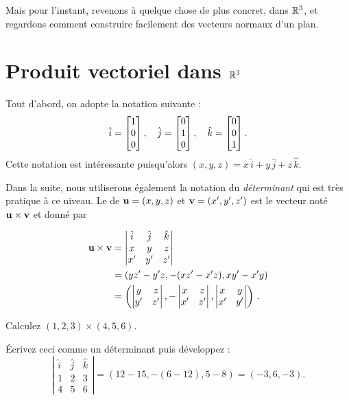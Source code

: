 Mais pour l'instant, revenons à quelque chose de plus concret, dans $\mathbb{R}^3$,
et regardons comment construire facilement des vecteurs normaux d'un plan.

\section{Produit vectoriel dans \texorpdfstring{$\mathbb{R}^3$}{R3}}

Tout d'abord, on adopte la notation suivante :
$$
\hat{i} = \left[ \begin{matrix} 1\\0\\0 \end{matrix} \right], \quad \hat{j} = \left[ \begin{matrix} 0\\1\\0 \end{matrix} \right], \quad \hat{k} = \left[ \begin{matrix} 0\\0\\1 \end{matrix} \right].
$$
Cette notation est intéressante puisqu'alors $(x,y,z) = x\,\hat{i} + y\,\hat{j} + z\,\hat{k}$.

Dans la suite, nous utiliserons également la notation du \emph{d\'eterminant} qui est très pratique à ce niveau.
Le  de $\mathbf{u} = (x,y,z)$ et $\mathbf{v}=(x', y', z')$
est le vecteur noté $\mathbf{u} \times \mathbf{v}$ et donné par 

\begin{align*}
\mathbf{u} \times \mathbf{v} &= \left| \begin{matrix}
\hat{i} & \hat{j} & \hat{k} \\
x & y & z\\
x' & y' & z' \end{matrix} \right|\\
&= \left( yz' - y'z, -(xz' - x'z), xy' - x'y \right) \\
&= \left( \left| \begin{matrix} y & z\\ y' & z' \end{matrix} \right|,
- \left| \begin{matrix} x & z\\ x' & z' \end{matrix} \right|,
\left| \begin{matrix} x & y\\ x' & y' \end{matrix} \right| \right)\,.
\end{align*}

\begin{myprob}
Calculez $(1,2,3)\times(4,5,6)$.

\begin{mysol}  Écrivez ceci comme un déterminant puis développez :
$$
\left| \begin{matrix}
\hat{i} & \hat{j} & \hat{k} \\
1 & 2 & 3\\
4 & 5 & 6 \end{matrix} \right|
= (12-15, -(6-12), 5-8) = (-3,6,-3). 
$$
\end{mysol}\end{myprob}


